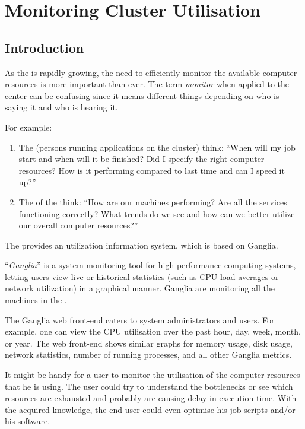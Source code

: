 \chapter{Monitoring Cluster Utilisation}
\label{ch:monitoring-cluster-utilization}

\section{Introduction}

As the \hpc is rapidly growing, the need to efficiently monitor the available
computer resources is more important than ever. The term \emph{monitor} when
applied to the \hpc center can be confusing since it means different things
depending on who is saying it and who is hearing it.

For example:

\begin{enumerate}
\item  The  (persons running applications on the cluster) think: ``When will my job start and when will it be finished? Did I specify the right computer resources?  How is it performing compared to last time and can I speed it up?''
\item  The  of the \hpc think: ``How are our machines
performing? Are all the services functioning correctly? What trends do we see and how can we better utilize our overall computer resources?''
\end{enumerate}

The \hpc provides an \hpc utilization information system, which is based on Ganglia.

``\emph{Ganglia}'' is a system-monitoring tool for high-performance computing
systems, letting users view live or historical statistics (such as CPU load
averages or network utilization) in a graphical manner. Ganglia are monitoring
all the machines in the \hpc.

The Ganglia web front-end caters to system administrators and users. For
example, one can view the CPU utilisation over the past hour, day, week, month,
or year. The web front-end shows similar graphs for memory usage, disk usage,
network statistics, number of running processes, and all other Ganglia metrics.

It might be handy for a user to monitor the utilisation of the computer
resources that he is using. The user could try to understand the bottlenecks or
see which resources are exhausted and probably are causing delay in execution
time. With the acquired knowledge, the end-user could even optimise his
job-scripts and/or his software.

